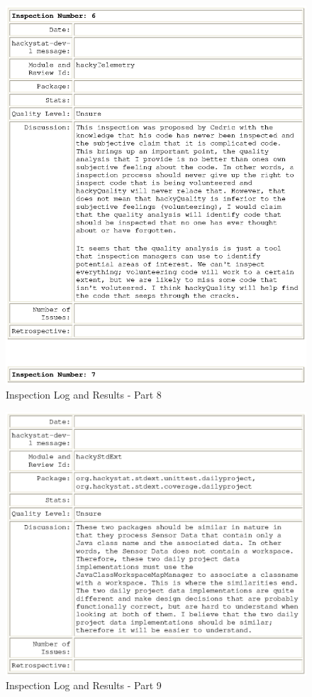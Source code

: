\begin{figure}[htbp]
  \centering
  \includegraphics[width=1.0\textwidth]{figs/engineeringlog_word_html_8.eps}
  \caption{Inspection Log and Results - Part 8}
  \label{fig:log8}
\end{figure}

\begin{figure}[htbp]
  \centering
  \includegraphics[width=1.0\textwidth]{figs/engineeringlog_word_html_9.eps}
  \caption{Inspection Log and Results - Part 9}
  \label{fig:log9}
\end{figure}






